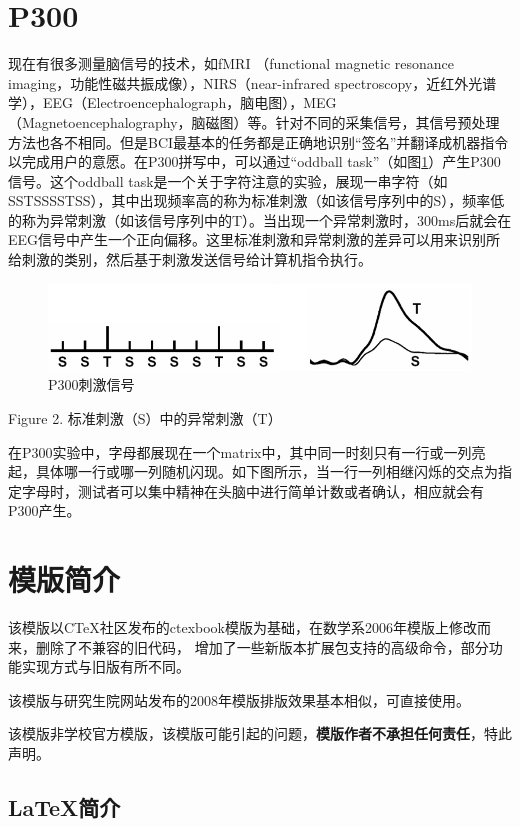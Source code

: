 \section{P300}


现在有很多测量脑信号的技术，如fMRI （functional magnetic resonance imaging，功能性磁共振成像），NIRS（near-infrared spectroscopy，近红外光谱学），EEG（Electroencephalograph，脑电图），MEG（Magnetoencephalography，脑磁图）等。针对不同的采集信号，其信号预处理方法也各不相同。但是BCI最基本的任务都是正确地识别“签名”并翻译成机器指令以完成用户的意愿。在P300拼写中，可以通过“oddball task”（如图\ref{Fig:P300_brief}）产生P300信号。这个oddball task是一个关于字符注意的实验，展现一串字符（如SSTSSSSTSS），其中出现频率高的称为标准刺激（如该信号序列中的S），频率低的称为异常刺激（如该信号序列中的T）。当出现一个异常刺激时，300ms后就会在EEG信号中产生一个正向偏移。这里标准刺激和异常刺激的差异可以用来识别所给刺激的类别，然后基于刺激发送信号给计算机指令执行。
 
\begin{figure}[htb]
\centering
\includegraphics[scale=0.6]{Pictures/Chap1/p300_example.png}
\caption{P300刺激信号}
\label{Fig:P300_brief}
\end{figure}
Figure 2. 标准刺激（S）中的异常刺激（T）

在P300实验中，字母都展现在一个matrix中，其中同一时刻只有一行或一列亮起，具体哪一行或哪一列随机闪现。如下图所示，当一行一列相继闪烁的交点为指定字母时，测试者可以集中精神在头脑中进行简单计数或者确认，相应就会有P300产生。


\section{模版简介}

该模版以CTeX社区发布的ctexbook模版为基础，在数学系2006年模版上修改而来，删除了不兼容的旧代码，
增加了一些新版本扩展包支持的高级命令，部分功能实现方式与旧版有所不同。

该模版与研究生院网站发布的2008年模版排版效果基本相似，可直接使用。

该模版非学校官方模版，该模版可能引起的问题，{\bfseries{}模版作者不承担任何责任}，特此声明。

\subsection{\LaTeX{}{}简介}

